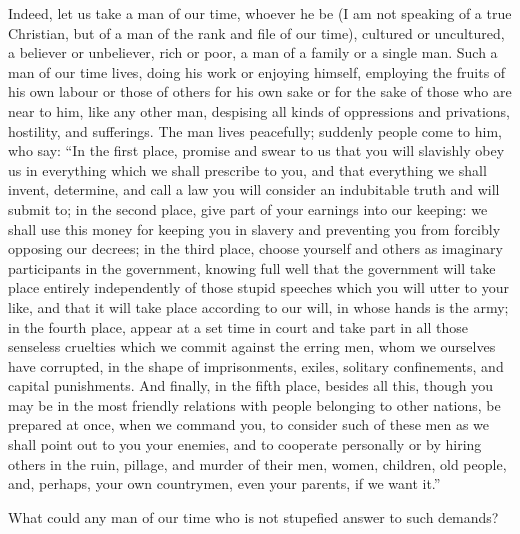 \documentclass{book}
\begin{document}
Indeed, let us take a man of our time, whoever he be (I am not speaking of a true Christian, but of a man of the rank and file of our time), cultured or uncultured, a believer or unbeliever, rich or poor, a man of a family or a single man. Such a man of our time lives, doing his work or enjoying himself, employing the fruits of his own labour or those of others for his own sake or for the sake of those who are near to him, like any other man, despising all kinds of oppressions and privations, hostility, and sufferings. The man lives peacefully; suddenly people come to him, who say: “In the first place, promise and swear to us that you will slavishly obey us in everything which we shall prescribe to you, and that everything we shall invent, determine, and call a law you will consider an indubitable truth and will submit to; in the second place, give part of your earnings into our keeping: we shall use this money for keeping you in slavery and preventing you from forcibly opposing our decrees; in the third place, choose yourself and others as imaginary participants in the government, knowing full well that the government will take place entirely independently of those stupid speeches which you will utter to your like, and that it will take place according to our will, in whose hands is the army; in the fourth place, appear at a set time in court and take part in all those senseless cruelties which we commit against the erring men, whom we ourselves have corrupted, in the shape of imprisonments, exiles, solitary confinements, and capital punishments. And finally, in the fifth place, besides all this, though you may be in the most friendly relations with people belonging to other nations, be prepared at once, when we command you, to consider such of these men as we shall point out to you your enemies, and to cooperate personally or by hiring others in the ruin, pillage, and murder of their men, women, children, old people, and, perhaps, your own countrymen, even your parents, if we want it.”

What could any man of our time who is not stupefied answer to such demands?
\end{document}
